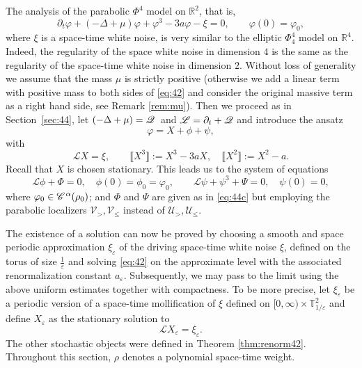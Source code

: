 \documentclass[a4paper,11pt]{article}
\renewcommand{\leq}{\leqslant}
\newcommand{\assign}{:=}
\numberwithin{equation}{section}
\newcommand{\CC}{\mathscr{C} \hspace{.1em}}
\newcommand{\LL}{\mathscr{L}}
\newcommand{\UU}{\mathscr{U}}
\newcommand{\VV}{\mathscr{V}}
\newcommand{\Q}{\mathscr{Q} \hspace{.2em}}
\newcommand{\R}{\mathbb{R}}
\newcommand{\8}{\infty}
\begin{document}
The analysis of the parabolic $\Phi^{4}$ model on $\R^{2}$, that is,
\begin{equation}\label{eq:42}
\partial_{t}\varphi+ (- \Delta + \mu) \varphi + \varphi^3 - 3 a \varphi - \xi = 0,\qquad\varphi(0)=\varphi_{0},
\end{equation}
where $\xi$ is a space-time white noise, is very similar to the elliptic $\Phi^{4}_{4}$ model on $\R^{4}$. Indeed, the regularity of the space white noise in dimension $4$ is the same as the regularity of the space-time white noise in dimension $2$. Without loss of generality we assume that the mass $\mu$ is strictly positive (otherwise we add a linear term with positive mass to both sides of \eqref{eq:42} and consider the original massive term as a right hand side, see Remark \ref{rem:mu}). Then we proceed as in Section~\ref{sec:44}, let $(- \Delta +
\mu) = \Q$ and $\LL=\partial_{t}+\Q\hspace{-.2em}$ and introduce the ansatz
\[ \varphi = X + \phi + \psi, \]
with
\begin{equation*}%
\LL X = \xi, \qquad \llbracket X^3 \rrbracket \assign X^3 - 3 a X, \quad
   \llbracket X^2 \rrbracket \assign X^2 - a.
\end{equation*}
Recall that $X$ is chosen stationary.
This leads us to the system of equations
\begin{equation}\label{eq:42b}
\LL \phi + \Phi = 0, \quad \phi(0)=\phi_{0}=\varphi_{0},\qquad \LL \psi + \psi^3 + \Psi = 0,\quad \psi(0)=0,
\end{equation}
where $\varphi_{0}\in \CC^{\alpha}(\rho_{0})$; and  $\Phi$ and $\Psi$ are given as in \eqref{eq:44c} but employing the parabolic localizers $\VV_{>},\VV_{\leq}$ instead of $\UU_{>},\UU_{\leq}$.



The existence of a solution can now be proved by choosing a smooth and space periodic approximation $\xi_{\varepsilon}$ of the driving space-time white noise $\xi$, defined on the torus of size $\frac 1\varepsilon$ and solving \eqref{eq:42} on the approximate level with the associated renormalization constant $a_{\varepsilon}$. Subsequently, we may pass to the limit using  the above uniform estimates together with  compactness. To be more precise, let $\xi_{\varepsilon}$ be a periodic version of a {space-time mollification} of $\xi$ defined on $[0,\8)\times\mathbb{T}^{2}_{1/\varepsilon}$ and define $X_{\varepsilon}$ as the stationary solution to
\begin{equation*}
\LL X_{\varepsilon} = \xi_{\varepsilon}.
\end{equation*}
The other stochastic objects were defined in Theorem \ref{thm:renorm42}. Throughout this section, $\rho$ denotes   a polynomial space-time weight. 
\end{document}
